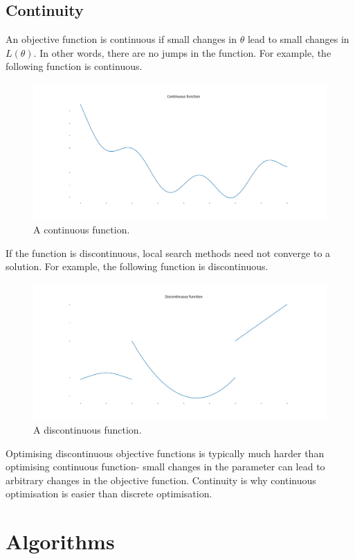 \documentclass[a4paper, openany]{memoir}
\begin{document}
\subsection{Continuity}
An objective function is continuous if small changes in $\theta$ lead to small changes in $L(\theta)$. In other words, there are no jumps in the function. For example, the following function is continuous.
\begin{figure}[H]
    \centering
    \includegraphics[scale=0.3]{src/4.9 continuous functions.png}
    \caption{A continuous function.}
\end{figure}
\noindent If the function is discontinuous, local search methods need not converge to a solution. For example, the following function is discontinuous.
\begin{figure}[H]
    \centering
    \includegraphics[scale=0.3]{src/4.10 noncontinuous functions.png}
    \caption{A discontinuous function.}
\end{figure}
\noindent Optimising discontinuous objective functions is typically much harder than optimising continuous function- small changes in the parameter can lead to arbitrary changes in the objective function. Continuity is why continuous optimisation is easier than discrete optimisation.

\section{Algorithms}
\end{document}
